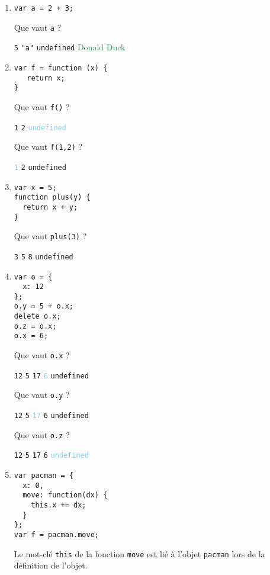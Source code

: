 \documentclass[a4paper, 12pt]{article}
\newcommand{\fullpoint}[1]{\textcolor{RubineRed}{#1}}
\newcommand{\halfpoint}[1]{\textcolor{SkyBlue}{#1}}
\newcommand{\jedipoint}[1]{\textcolor{SeaGreen}{#1}}
\newcommand{\choice}[1]{\Square\hspace{2pt} #1\hspace{5pt}}
\newcommand{\choicec}[1]{\Square\hspace{2pt} \lstinline{#1}\hspace{5pt}}
\newcommand{\choicecg}[1]{\fullpoint{\XBox\hspace{2pt} \lstinline{#1}\hspace{5pt}}}
\newcommand{\choicecgh}[1]{\halfpoint{\XBox\hspace{2pt} \lstinline{#1}\hspace{5pt}}}
\begin{document}
\begin{enumerate}
\item \lstset{language=javascript}
\begin{lstlisting}
var a = 2 + 3;
\end{lstlisting}

  Que vaut \lstinline{a} ?

  \choicecg{5} \choicec{"a"} \choicec{undefined} \jedipoint{\choice{Donald Duck}}
\item \lstset{language=javascript}
\begin{lstlisting}
var f = function (x) {
   return x;
}
\end{lstlisting}

   Que vaut \lstinline{f()} ?

   \choicec{1} \choicec{2} \choicecgh{undefined}

   Que vaut \lstinline{f(1,2)} ?

   \choicecgh{1} \choicec{2} \choicec{undefined}
\item \lstset{language=javascript}
\begin{lstlisting}
var x = 5;
function plus(y) {
  return x + y;
}
\end{lstlisting}

  Que vaut \lstinline{plus(3)} ?

  \choicec{3} \choicec{5} \choicecg{8} \choicec{undefined}
\item \lstset{language=javascript}
\begin{lstlisting}
var o = {
  x: 12
};
o.y = 5 + o.x;
delete o.x;
o.z = o.x;
o.x = 6;
\end{lstlisting}

  Que vaut \lstinline{o.x} ?

  \choicec{12} \choicec{5} \choicec{17} \choicecgh{6} \choicec{undefined}

  Que vaut \lstinline{o.y} ?

  \choicec{12} \choicec{5} \choicecgh{17} \choicec{6} \choicec{undefined}

  Que vaut \lstinline{o.z} ?

  \choicec{12} \choicec{5} \choicec{17} \choicec{6} \choicecgh{undefined}
\item \lstset{language=javascript}
\begin{lstlisting}
var pacman = {
  x: 0,
  move: function(dx) {
    this.x += dx;
  }
};
var f = pacman.move;
\end{lstlisting}

  Le mot-clé \lstinline{this} de la fonction \lstinline{move} est lié
  à l'objet \lstinline{pacman} lors de la définition de l'objet.


\end{enumerate}
\end{document}
